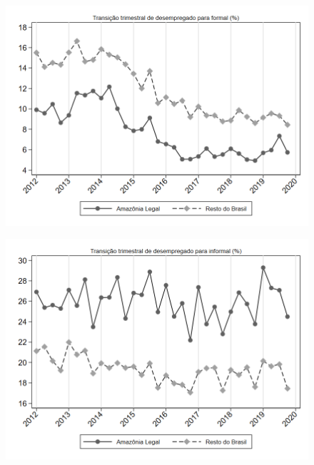 \begin{frame}[label=_transicao_ocupacao_sh_desempregado_sh_formal]{}
\textit{\hyperlink{_transicao_ocupacao}{}}
\begin{figure}
  \centering
  \includegraphics[width=1\linewidth]{../../analysis/output/transicao_ocupacao/_transicao_ocupacao_sh_desempregado_sh_formal.png}
  \caption{}
  \label{fig:_transicao_ocupacao_sh_desempregado_sh_formal}
\end{figure}
\end{frame}

\begin{frame}[label=_transicao_ocupacao_sh_desempregado_sh_informal]{}
\textit{\hyperlink{_transicao_ocupacao}{}}
\begin{figure}
  \centering
  \includegraphics[width=1.0\linewidth]{../../analysis/output/transicao_ocupacao/_transicao_ocupacao_sh_desempregado_sh_informal.png}
  \caption{}
  \label{fig:_transicao_ocupacao_sh_desempregado_sh_informal}
\end{figure}
\end{frame}

